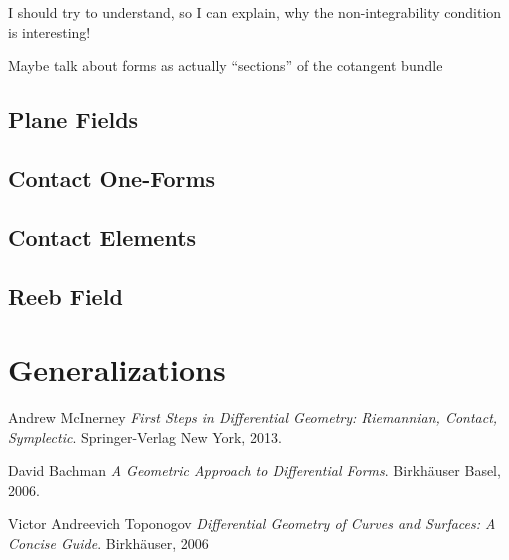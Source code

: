 \documentclass{article}
\begin{document}
I should try to understand, so I can explain, why the non-integrability
condition is interesting!

Maybe talk about forms as actually ``sections'' of the cotangent bundle

\subsection {Plane Fields}

\subsection {Contact One-Forms}

\subsection {Contact Elements}

\subsection {Reeb Field}

\section {Generalizations}

\begin{thebibliography}{9}

{}
  
  Andrew McInerney
  \textit{First Steps in Differential Geometry: Riemannian, Contact, Symplectic}. 
  Springer-Verlag New York, 2013.

  David Bachman
  \textit{A Geometric Approach to Differential Forms}.
  Birkhäuser Basel, 2006.

  Victor Andreevich Toponogov
  \textit{Differential Geometry of Curves and Surfaces: A Concise Guide}. 
  Birkhäuser, 2006

\end{thebibliography}
\end{document}

